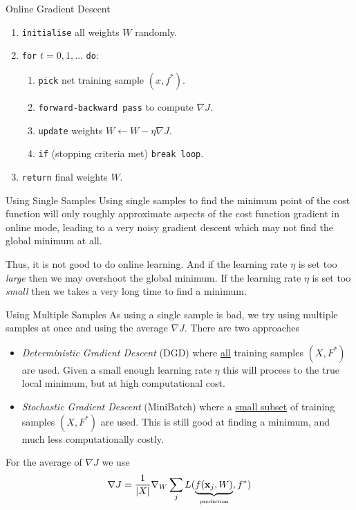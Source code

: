 \documentclass[11pt,a4paper]{article}
\begin{document}
\begin{definition}{Online Gradient Descent}
  \begin{enumerate}
    \item \texttt{initialise} all weights $W$ randomly.
    \item \texttt{for} $t=0,1,\dots$ \texttt{do}:
    \begin{enumerate}
      \item \texttt{pick} net training sample $(x,f^*)$.
      \item \texttt{forward-backward pass} to compute $\nabla J$.
      \item \texttt{update} weights $W\leftarrow W-\eta\nabla J$.
      \item \texttt{if} (stopping criteria met) \texttt{break loop}.
    \end{enumerate}
    \item \texttt{return} final weights $W$.
  \end{enumerate}
\end{definition}

\begin{remark}{Using Single Samples}
  Using single samples to find the minimum point of the cost function will only roughly approximate aspects of the cost function gradient in online mode, leading to a very noisy gradient descent which may not find the global minimum at all.
  \par Thus, it is not good to do online learning. And if the learning rate $\eta$ is set too \textit{large} then we may overshoot the global minimum. If the learning rate $\eta$ is set too \textit{small} then we takes a very long time to find a minimum.
\end{remark}

\begin{proposition}{Using Multiple Samples}
  As using a single sample is bad, we try using multiple samples at once and using the average $\nabla J$. There are two approaches
  \begin{itemize}
    \item \textit{Deterministic Gradient Descent} (DGD) where \underline{all} training samples $(X,F^*)$ are used. Given a small enough learning rate $\eta$ this will process to the true local minimum, but at high computational cost.
    \item \textit{Stochastic Gradient Descent} (MiniBatch) where a \underline{small subset} of training samples $(X,F^*)$ are used. This is still good at finding a minimum, and much less computationally costly.
  \end{itemize}
  For the average of $\nabla J$ we use
  \[ \nabla J=\frac1{|X|}\nabla_W\sum_j L(\underbrace{f(\mathbf{x}_j,W)}_\text{\tiny prediction},f^*) \]
\end{proposition}
\end{document}
